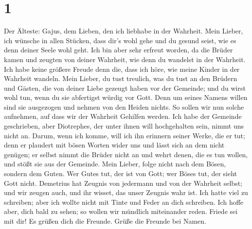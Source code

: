 \hypertarget{section}{%
\section{1}\label{section}}

 Der Älteste: Gajus, dem Lieben, den ich liebhabe in der
Wahrheit.  Mein Lieber, ich wünsche in allen Stücken, dass
dir's wohl gehe und du gesund seist, wie es denn deiner Seele wohl geht.
 Ich bin aber sehr erfreut worden, da die Brüder kamen und
zeugten von deiner Wahrheit, wie denn du wandelst in der Wahrheit.
 Ich habe keine größere Freude denn die, dass ich höre, wie
meine Kinder in der Wahrheit wandeln.  Mein Lieber, du tust
treulich, was du tust an den Brüdern und Gästen,  die von
deiner Liebe gezeugt haben vor der Gemeinde; und du wirst wohl tun, wenn
du sie abfertigst würdig vor Gott.  Denn um seines Namens
willen sind sie ausgezogen und nehmen von den Heiden nichts.
 So sollen wir nun solche aufnehmen, auf dass wir der
Wahrheit Gehilfen werden.  Ich habe der Gemeinde
geschrieben, aber Diotrephes, der unter ihnen will hochgehalten sein,
nimmt uns nicht an.  Darum, wenn ich komme, will ich ihn
erinnern seiner Werke, die er tut; denn er plaudert mit bösen Worten
wider uns und lässt sich an dem nicht genügen; er selbst nimmt die
Brüder nicht an und wehrt denen, die es tun wollen, und stößt sie aus
der Gemeinde.  Mein Lieber, folge nicht nach dem Bösen,
sondern dem Guten. Wer Gutes tut, der ist von Gott; wer Böses tut, der
sieht Gott nicht.  Demetrius hat Zeugnis von jedermann und
von der Wahrheit selbst; und wir zeugen auch, und ihr wisset, das unser
Zeugnis wahr ist.  Ich hatte viel zu schreiben; aber ich
wollte nicht mit Tinte und Feder an dich schreiben.  Ich
hoffe aber, dich bald zu sehen; so wollen wir mündlich miteinander
reden.  Friede sei mit dir! Es grüßen dich die Freunde.
Grüße die Freunde bei Namen.
